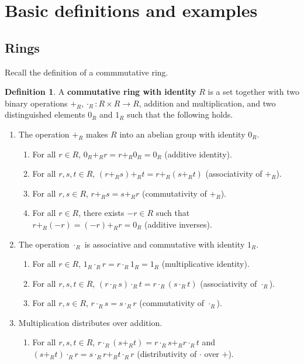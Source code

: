 \documentclass{article}
\newcommand{\rb}[1]{\left( #1 \right)}
\theoremstyle{definition}\newtheorem{definition}{Definition}[subsection]
\theoremstyle{definition}\newtheorem{remark}[definition]{Remark}
\theoremstyle{definition}\newtheorem*{example}{Example}
\theoremstyle{definition}\newtheorem*{note}{Note}
\begin{document}
\section{Basic definitions and examples}

\subsection{Rings}

Recall the definition of a commmutative ring.

\begin{definition}
A \textbf{commutative ring with identity} $ R $ is a set together with two binary operations $ +_R, \cdot_R : R \times R \to R $, addition and multiplication, and two distinguished elements $ 0_R $ and $ 1_R $ such that the following holds.
\begin{enumerate}
\item The operation $ +_R $ makes $ R $ into an abelian group with identity $ 0_R $.
\begin{enumerate}
\item For all $ r \in R $, $ 0_R +_R r = r +_R 0_R = 0_R $ (additive identity).
\item For all $ r, s, t \in R $, $ \rb{r +_R s} +_R t = r +_R \rb{s +_R t} $  (associativity of $ +_R $).
\item For all $ r, s \in R $, $ r +_R s = s +_R r $ (commutativity of $ +_R $).
\item For all $ r \in R $, there exists $ -r \in R $ such that $ r +_R \rb{-r} = \rb{-r} +_R r = 0_R $ (additive inverses).
\end{enumerate}
\item The operation $ \cdot_R $ is associative and commutative with identity $ 1_R $.
\begin{enumerate}
\item For all $ r \in R $, $ 1_R \cdot_R r = r \cdot_R 1_R = 1_R $ (multiplicative identity).
\item For all $ r, s, t \in R $, $ \rb{r \cdot_R s} \cdot_R t = r \cdot_R \rb{s \cdot_R t} $ (associativity of $ \cdot_R $).
\item For all $ r, s \in R $, $ r \cdot_R s = s \cdot_R r $ (commutativity of $ \cdot_R $).
\end{enumerate}
\item Multiplication distributes over addition.
\begin{enumerate}
\item For all $ r, s, t \in R $, $ r \cdot_R \rb{s +_R t} = r \cdot_R s +_R r \cdot_R t $ and $ \rb{s +_R t} \cdot_R r = s \cdot_R r +_R t \cdot_R r $ (distributivity of $ \cdot $ over $ + $).
\end{enumerate}
\end{enumerate}
\end{definition}
\end{document}

